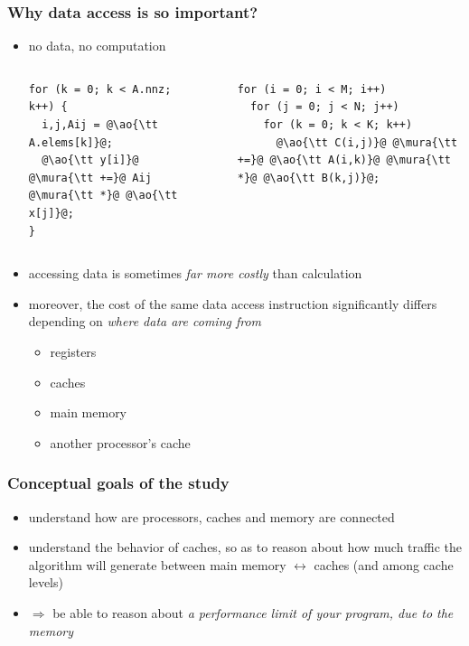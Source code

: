 \documentclass[12pt,dvipdfmx]{beamer}
\newcommand{\mura}[1]{{\color{purple}#1}}
\newcommand{\ao}[1]{{\color{blue}#1}}
\newcommand{\aka}[1]{{\color{red}#1}}
\begin{document}
\begin{frame}[fragile]
\frametitle{Why data access is so important?}
\begin{itemize}
\item<1-> no \ao{data}, no \mura{computation}
  \begin{columns}
    \begin{column}{0.42\textwidth}
\begin{lstlisting}
for (k = 0; k < A.nnz; k++) {
  i,j,Aij = @\ao{\tt A.elems[k]}@;
  @\ao{\tt y[i]}@ @\mura{\tt +=}@ Aij @\mura{\tt *}@ @\ao{\tt x[j]}@;
}
\end{lstlisting}
    \end{column}
    \begin{column}{0.03\textwidth}
    \end{column}
    \begin{column}{0.42\textwidth}
\begin{lstlisting}
for (i = 0; i < M; i++)  
  for (j = 0; j < N; j++)  
    for (k = 0; k < K; k++)  
      @\ao{\tt C(i,j)}@ @\mura{\tt +=}@ @\ao{\tt A(i,k)}@ @\mura{\tt *}@ @\ao{\tt B(k,j)}@;
\end{lstlisting}
    \end{column}
  \end{columns}


\item<2-> accessing data is sometimes 
  \aka{\it far more costly} than calculation
\item<3-> moreover, the cost of the same data access instruction
  significantly differs
  depending on \ao{\em where data are coming from}
  \begin{itemize}
  \item registers
  \item caches
  \item main memory
  \item another processor's cache
  \end{itemize}
\end{itemize}
\end{frame}

\begin{frame}
\frametitle{Conceptual goals of the study}
\begin{itemize}
\item understand how are processors, caches and memory are connected
\item understand the behavior of caches,
  so as to reason about how much traffic the algorithm will generate
  between main memory $\leftrightarrow$ caches
  (and among cache levels)
\item $\Rightarrow$ be able to reason about 
  \ao{\emph{a performance limit of your program,
      due to the memory}}
\end{itemize}
\end{frame}
\end{document}
